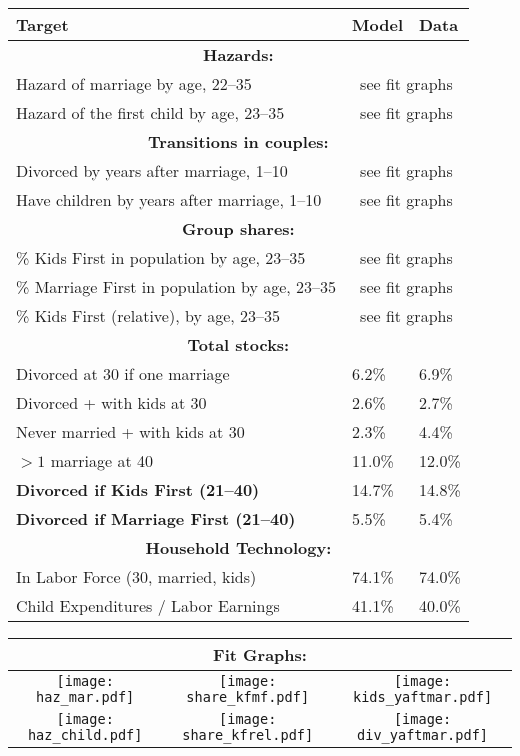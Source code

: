 \documentclass[12pt,letter]{article}
\begin{document}
{
\begin{center}
\begin{tabular}{|l|l|l|}\hline
Target & Model & Data \\\hline
\multicolumn{3}{|c|}{\textbf{Hazards:}} \\\hline
Hazard of marriage by age, 22--35 & \multicolumn{2}{|c|}{see fit graphs}\\
Hazard of the first child by age, 23--35 & \multicolumn{2}{|c|}{see fit graphs}\\\hline
\multicolumn{3}{|c|}{\textbf{Transitions in couples:}} \\\hline
Divorced by years after marriage, 1--10 & \multicolumn{2}{|c|}{see fit graphs}\\
Have children by years after marriage, 1--10 & \multicolumn{2}{|c|}{see fit graphs}\\\hline
\multicolumn{3}{|c|}{\textbf{Group shares:}} \\\hline
\% Kids First in population by age, 23--35 & \multicolumn{2}{|c|}{see fit graphs}\\
\% Marriage First in population by age, 23--35 & \multicolumn{2}{|c|}{see fit graphs}\\
\% Kids First (relative), by age, 23--35 & \multicolumn{2}{|c|}{see fit graphs}\\\hline
\multicolumn{3}{|c|}{\textbf{Total stocks:}}\\\hline
Divorced at 30 if one marriage & 6.2\% & 6.9\% \\
Divorced + with kids at 30  & 2.6\% & 2.7\% \\
Never married + with kids at 30  & 2.3\% & 4.4\% \\
$>1$ marriage at 40 & 11.0\% & 12.0\% \\
\textbf{Divorced if Kids First (21--40) }&14.7\% &14.8\% \\
\textbf{Divorced if Marriage First (21--40)} &5.5\% & 5.4\% \\\hline
\multicolumn{3}{|c|}{\textbf{Household Technology:}}\\\hline
In Labor Force (30, married, kids) & 74.1\% & 74.0\% \\
Child Expenditures / Labor Earnings & 41.1\% & 40.0\% \\
\hline
\end{tabular}
\end{center}


\hspace{-1cm}\begin{tabular}{|c|c|c|}\hline
\multicolumn{3}{|c|}{\textbf{Fit Graphs:}}\\\hline
\texttt{[image: haz\_mar.pdf]} & \texttt{[image: share\_kfmf.pdf]} & \texttt{[image: kids\_yaftmar.pdf]} \\\hline
\texttt{[image: haz\_child.pdf]} & \texttt{[image: share\_kfrel.pdf]}   & \texttt{[image: div\_yaftmar.pdf]}  \\\hline
\end{tabular}


}
\end{document}
